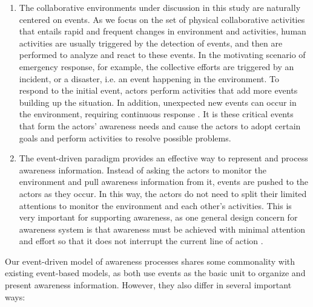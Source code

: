 \begin{enumerate}
   \item The collaborative environments under discussion in this study are naturally centered on events. As we focus on the set of physical collaborative activities that entails rapid and frequent changes in environment and activities, human activities are usually triggered by the detection of events, and then are performed to analyze and react to these events. In the motivating scenario of emergency response, for example, the collective efforts are triggered by an incident, or a disaster, i.e. an event happening in the environment. To respond to the initial event, actors perform activities that add more events building up the situation. In addition, unexpected new events can occur in the environment, requiring continuous response \cite{Turoff2004}. It is these critical events that form the actors' awareness needs and cause the actors to adopt certain goals and perform activities to resolve possible problems.
   \item The event-driven paradigm provides an effective way to represent and process awareness information. Instead of asking the actors to monitor the environment and pull awareness information from it, events are pushed to the actors as they occur. In this way, the actors do not need to split their limited attentions to monitor the environment and each other's activities. This is very important for supporting awareness, as one general design concern for awareness system is that awareness must be achieved with minimal attention and effort so that it does not interrupt the current line of action \cite{schmidt2002a}. 
\end{enumerate}

Our event-driven model of awareness processes shares some commonality with existing event-based models, as both use events as the basic unit to organize and present awareness information. However, they also differ in several important ways:

